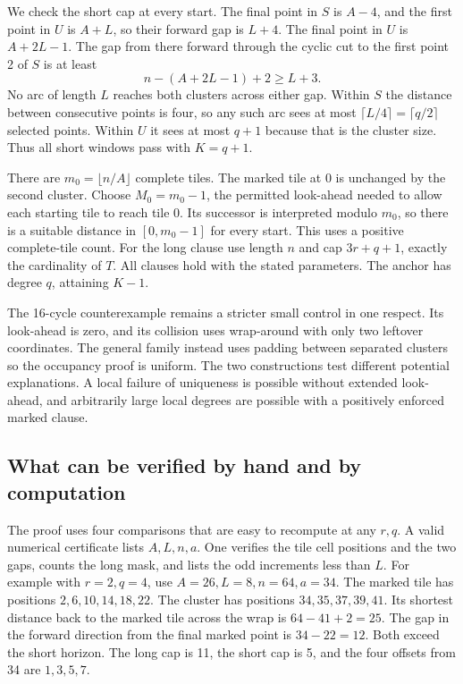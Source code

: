 \documentclass[12pt,letterpaper]{article}
\begin{document}
We check the short cap at every start. The final point in \(S\) is \(A-4\), and the first point in \(U\) is \(A+L\), so their forward gap is \(L+4\). The final point in \(U\) is \(A+2L-1\). The gap from there forward through the cyclic cut to the first point 2 of \(S\) is at least
\[
         n-(A+2L-1)+2\ge L+3 .
\]
No arc of length \(L\) reaches both clusters across either gap. Within \(S\) the distance between consecutive points is four, so any such arc sees at most \(\lceil L/4\rceil=\lceil q/2\rceil\) selected points. Within \(U\) it sees at most \(q+1\) because that is the cluster size. Thus all short windows pass with \(K=q+1\).

There are \(m_0=\lfloor n/A\rfloor\) complete tiles. The marked tile at 0 is unchanged by the second cluster. Choose \(M_0=m_0-1\), the permitted look-ahead needed to allow each starting tile to reach tile 0. Its successor is interpreted modulo \(m_0\), so there is a suitable distance in \([0,m_0-1]\) for every start. This uses a positive complete-tile count. For the long clause use length \(n\) and cap \(3r+q+1\), exactly the cardinality of \(T\). All clauses hold with the stated parameters. The anchor has degree \(q\), attaining \(K-1\).

The 16-cycle counterexample remains a stricter small control in one respect. Its look-ahead is zero, and its collision uses wrap-around with only two leftover coordinates. The general family instead uses padding between separated clusters so the occupancy proof is uniform. The two constructions test different potential explanations. A local failure of uniqueness is possible without extended look-ahead, and arbitrarily large local degrees are possible with a positively enforced marked clause.

\subsection{What can be verified by hand and by computation}

The proof uses four comparisons that are easy to recompute at any $r,q$. A valid numerical certificate lists \(A,L,n,a\). One verifies the tile cell positions and the two gaps, counts the long mask, and lists the odd increments less than \(L\). For example with \(r=2,q=4\), use \(A=26,L=8,n=64,a=34\). The marked tile has positions \(2,6,10,14,18,22\). The cluster has positions \(34,35,37,39,41\). Its shortest distance back to the marked tile across the wrap is \(64-41+2=25\). The gap in the forward direction from the final marked point is \(34-22=12\). Both exceed the short horizon. The long cap is 11, the short cap is 5, and the four offsets from 34 are \(1,3,5,7\).
\end{document}
